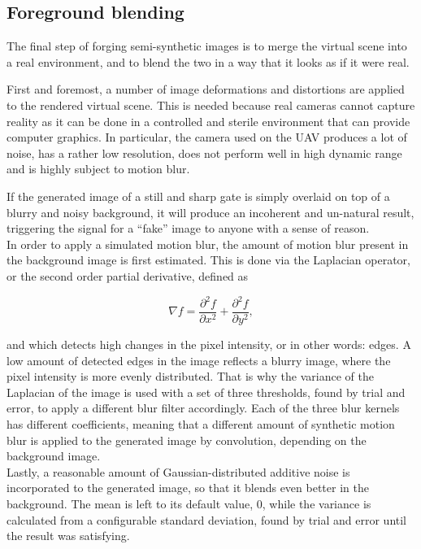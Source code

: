 \subsection{Foreground blending}

The final step of forging semi-synthetic images is to merge the virtual scene
into a real environment, and to blend the two in a way that it looks as if it
were real.

First and foremost, a number of image deformations and distortions are applied
to the rendered virtual scene. This is needed because real cameras cannot
capture reality as it can be done in a controlled and sterile environment that
can provide computer graphics. In particular, the camera used on the UAV
produces a lot of noise, has a rather low resolution, does not perform well in
high dynamic range and is highly subject to motion blur.

If the generated image of a still and sharp gate is simply overlaid on top of
a blurry and noisy background, it will produce an incoherent and un-natural
result, triggering the signal for a ``fake'' image to anyone with a sense of
reason.\\

In order to apply a simulated motion blur, the amount of motion blur present in
the background image is first estimated. This is done via the Laplacian
operator, or the second order partial derivative, defined as

\begin{equation} \label{equ:laplacianoperator}
    \nabla f = \frac{\partial^2 f}{\partial x^2}
        + \frac{\partial^2 f}{\partial y^2},
\end{equation}

and which detects high changes in the pixel intensity, or in other words:
edges. A low amount of detected edges in the image reflects a blurry image,
where the pixel intensity is more evenly distributed. That is why the variance
of the Laplacian of the image is used with a set of three thresholds, found by
trial and error, to apply a different blur filter accordingly. Each of the
three blur kernels has different coefficients, meaning that a different amount
of synthetic motion blur is applied to the generated image by convolution,
depending on the background image.\\

Lastly, a reasonable amount of Gaussian-distributed additive noise is
incorporated to the generated image, so that it blends even better in the
background. The mean is left to its default value, 0, while the variance is
calculated from a configurable standard deviation, found by trial and error
until the result was satisfying.
